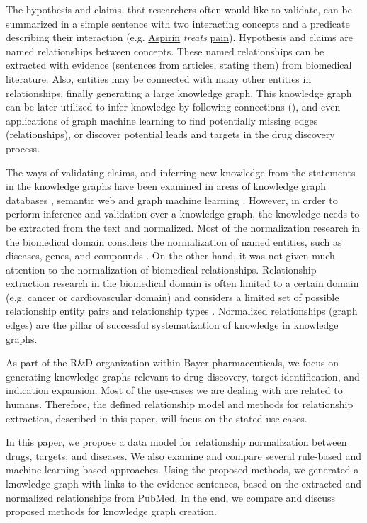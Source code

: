 \documentclass[final,12pt,3p,times,twocolumn,authoryear]{elsarticle}
\begin{document}
The hypothesis and claims, that researchers often would like to validate, can be summarized in a simple sentence with two interacting concepts and a predicate describing their interaction (e.g. \underline{Aspirin} \textit{treats} \underline{pain}). Hypothesis and claims are named relationships between concepts. These named relationships can be extracted with evidence (sentences from articles, stating them) from biomedical literature. Also, entities may be connected with many other entities in relationships, finally generating a large knowledge graph. This knowledge graph can be later utilized to infer knowledge by following connections (), and even applications of graph machine learning to find potentially missing edges (relationships), or discover potential leads and targets in the drug discovery process. 

The ways of validating claims, and inferring new knowledge from the statements in the knowledge graphs have been examined in areas of knowledge graph databases \citep{messina2017biograkn,miller2013graph}, semantic web \citep{mcguinness2004owl,parsia2004pellet,sirin2007pellet,shearer2008hermit} and graph machine learning \citep{scarselli2008graph,velivckovic2017graph,qu2019gmnn}. However, in order to perform inference and validation over a knowledge graph, the knowledge needs to be extracted from the text and normalized. Most of the normalization research in the biomedical domain considers the normalization of named entities, such as diseases, genes, and compounds \citep{cho2017method,ji2020bert,zhou2020knowledge}. On the other hand, it was not given much attention to the normalization of biomedical relationships. Relationship extraction research in the biomedical domain is often limited to a certain domain (e.g. cancer or cardiovascular domain) and considers a limited set of possible relationship entity pairs and relationship types \citep{rindflesch1999edgar,yang2021mining}. Normalized relationships (graph edges) are the pillar of successful systematization of knowledge in knowledge graphs.

As part of the R\&D organization within Bayer pharmaceuticals, we focus on generating knowledge graphs relevant to drug discovery, target identification, and indication expansion. Most of the use-cases we are dealing with are related to humans. Therefore, the defined relationship model and methods for relationship extraction, described in this paper, will focus on the stated use-cases.    

In this paper, we propose a data model for relationship normalization between drugs, targets, and diseases. We also examine and compare several rule-based and machine learning-based approaches. Using the proposed methods, we generated a knowledge graph with links to the evidence sentences, based on the extracted and normalized relationships from PubMed. In the end, we compare and discuss proposed methods for knowledge graph creation. 
\end{document}
